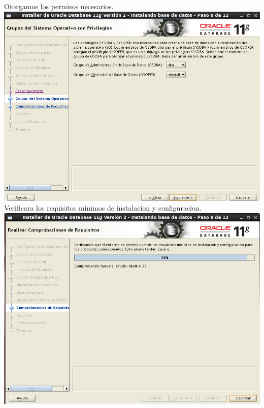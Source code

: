 \documentclass[a4paper,openright,12pt]{book}
\begin{document}
\begin{center}
Otorgamos los permisos necesarios.\\
\includegraphics[width=15cm]{./oracle linux/19.png}
Verificara los requisitos minimos de instalacion y configuracion.\\
\includegraphics[width=15cm]{./oracle linux/20.png}

\end{center}
\end{document}
